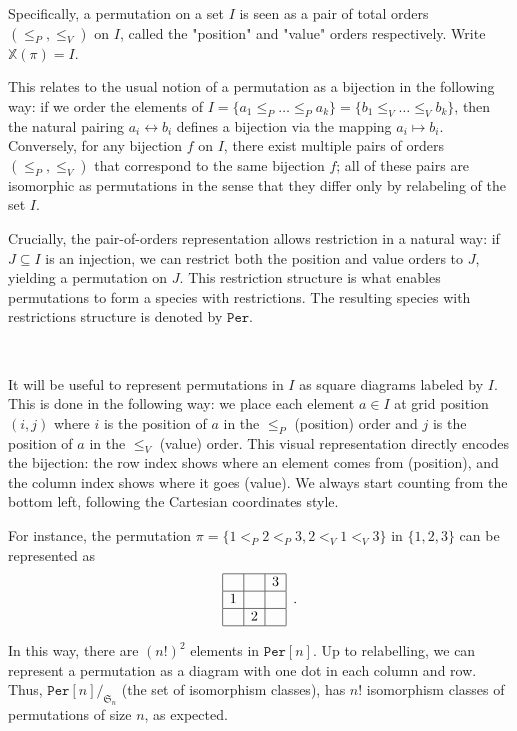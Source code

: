 \documentclass[12pt, reqno]{amsart}
\theoremstyle{definition}
\begin{document}
Specifically, a permutation on a set $I$ is seen as a pair of total orders $(\leq_P, \leq_V)$ on $I$, called the "position" and "value" orders respectively. Write $\mathbb{X}(\pi) = I$.

This relates to the usual notion of a permutation as a bijection in the following way: if we order the elements of $I = \{a_1 \leq_P \dots \leq_P a_k \} = \{ b_1 \leq_V \dots \leq_V b_k \}$, then the natural pairing $a_i \leftrightarrow b_i$ defines a bijection via the mapping $a_i \mapsto b_i$. Conversely, for any bijection $f$ on $I$, there exist multiple pairs of orders $(\leq_P, \leq_V)$ that correspond to the same bijection $f$; all of these pairs are isomorphic as permutations in the sense that they differ only by relabeling of the set $I$.

Crucially, the pair-of-orders representation allows restriction in a natural way: if $J \subseteq I$ is an injection, we can restrict both the position and value orders to $J$, yielding a permutation on $J$. This restriction structure is what enables permutations to form a species with restrictions.
The resulting species with restrictions structure is denoted by $\mathtt{Per}$.

\

It will be useful to represent permutations in $I$ as square diagrams labeled by $I$.
This is done in the following way: we place each element $a \in I$ at grid position $(i, j)$ where $i$ is the position of $a$ in the $\leq_P$ (position) order and $j$ is the position of $a$ in the $\leq_V$ (value) order. This visual representation directly encodes the bijection: the row index shows where an element comes from (position), and the column index shows where it goes (value).
We always start counting from the bottom left, following the Cartesian coordinates style.

For instance, the permutation $\pi = \{1<_P2<_P3 , 2<_V1<_V3\}$ in $\{1, 2, 3\}$ can be represented as 
\begin{equation}
\begin{array}{|c|c|c|}
	\hline & & 3 \\
    \hline 1 & &  \\
    \hline & 2 & \\
    \hline 
\end{array}\, \, \, .
\end{equation}

In this way, there are $(n!)^2 $ elements in $\mathtt{Per}[n]$.
Up to relabelling, we can represent a permutation as a diagram with one dot in each column and row.
Thus, $\mathtt{Per}[n]/_{\mathfrak S_n}$ (the set of isomorphism classes), has $n!$ isomorphism classes of permutations of size $n$, as expected.
\
\end{document}
